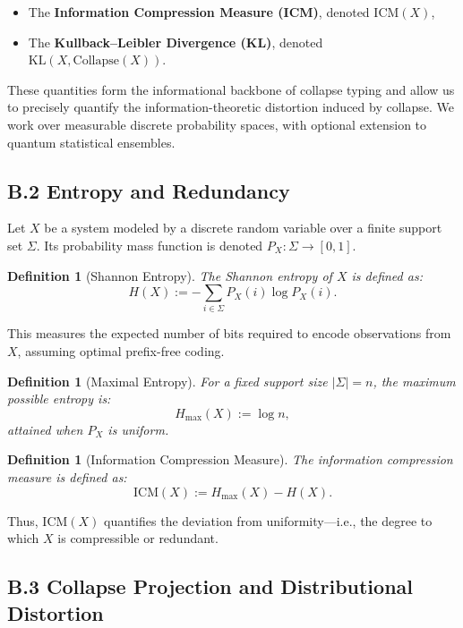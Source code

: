 \documentclass[11pt]{article}
\newtheorem{definition}[theorem]{Definition}
\begin{document}
\begin{itemize}
    \item The \textbf{Information Compression Measure (ICM)}, denoted \( \mathrm{ICM}(X) \),
    \item The \textbf{Kullback–Leibler Divergence (KL)}, denoted \( \mathrm{KL}(X, \mathrm{Collapse}(X)) \).
\end{itemize}

These quantities form the informational backbone of collapse typing and allow us to precisely quantify the information-theoretic distortion induced by collapse. We work over measurable discrete probability spaces, with optional extension to quantum statistical ensembles.

\subsection*{B.2 Entropy and Redundancy}

Let \( X \) be a system modeled by a discrete random variable over a finite support set \( \Sigma \). Its probability mass function is denoted \( P_X : \Sigma \to [0,1] \).

\begin{definition}[Shannon Entropy]
The Shannon entropy of \( X \) is defined as:
\[
H(X) := - \sum_{i \in \Sigma} P_X(i) \log P_X(i).
\]
\end{definition}

This measures the expected number of bits required to encode observations from \( X \), assuming optimal prefix-free coding.

\begin{definition}[Maximal Entropy]
For a fixed support size \( |\Sigma| = n \), the maximum possible entropy is:
\[
H_{\max}(X) := \log n,
\]
attained when \( P_X \) is uniform.
\end{definition}

\begin{definition}[Information Compression Measure]
The information compression measure is defined as:
\[
\mathrm{ICM}(X) := H_{\max}(X) - H(X).
\]
\end{definition}

Thus, \( \mathrm{ICM}(X) \) quantifies the deviation from uniformity—i.e., the degree to which \( X \) is compressible or redundant.

\subsection*{B.3 Collapse Projection and Distributional Distortion}
\end{document}
